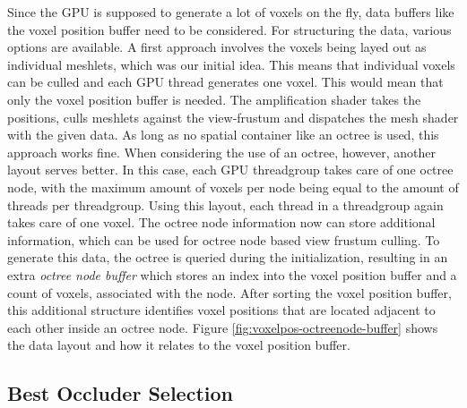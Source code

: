\noindent
Since the \ac{GPU} is supposed to generate a lot of voxels on the fly, data buffers like the voxel position buffer 
need to be considered.
For structuring the data, various options are available. A first approach involves the voxels being layed 
out as individual meshlets, which was our initial idea. This means that individual voxels can be culled and 
each \ac{GPU} thread generates one voxel. This would mean that only the voxel position buffer is needed. 
The amplification shader takes the positions, culls meshlets against the view-frustum and dispatches the 
mesh shader with the given data. As long as no spatial container like an octree is used, this approach works 
fine. When considering the use of an octree, however, another layout serves better. In this case, each \ac{GPU} 
threadgroup takes care of one octree node, with the maximum amount of voxels per node being equal to the 
amount of threads per threadgroup. Using this layout, each thread in a threadgroup again takes care of one 
voxel. The octree node information now can store additional information, which can be used for octree node 
based view frustum culling. To generate this data, the octree is queried during the initialization, resulting 
in an extra \emph{octree node buffer} which stores an index into the voxel position buffer and a count of voxels,
associated with the node. After sorting the voxel position buffer, this additional structure identifies voxel 
positions that are located adjacent to each other inside an octree node. Figure \ref{fig:voxelpos-octreenode-buffer} 
shows the data layout and how it relates to the voxel position buffer. 


\subsection*{Best Occluder Selection} \label{subsec-best-occluder-selection}

